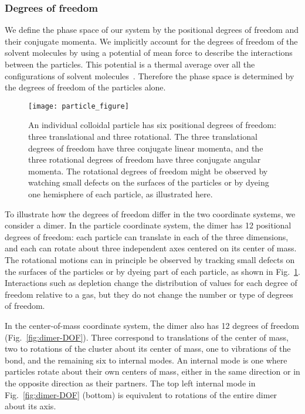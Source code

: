\documentclass[pre, aps, twocolumn, reprint, amsmath,amssymb, showpacs,
superscriptaddress] {revtex4-1}
\begin{document}
\subsubsection{Degrees of freedom}

We define the phase space of our system by the positional degrees of
freedom and their conjugate momenta. We implicitly account for the
degrees of freedom of the solvent molecules by using a potential of mean
force to describe the interactions between the particles. This potential
is a thermal average over all the configurations of solvent
molecules~\cite{poon_introduction_2006}. Therefore the phase space is
determined by the degrees of freedom of the particles alone.

\begin{figure}
	\begin{centering}
    \texttt{[image: particle\_figure]}
    \caption{An individual colloidal particle has six positional degrees
      of freedom: three translational and three rotational.  The three translational
      degrees of freedom have three conjugate linear momenta, and the three
      rotational degrees of freedom have three conjugate angular momenta.
      The rotational degrees of freedom might be observed by watching
      small defects on the surfaces of the particles or by dyeing one
      hemisphere of each particle, as illustrated here.
      \label{fig:ParticleDOF}}
	\end{centering}
\end{figure}

To illustrate how the degrees of freedom differ in the two coordinate
systems, we consider a dimer. In the particle coordinate system, the
dimer has 12 positional degrees of freedom: each particle can translate
in each of the three dimensions, and each can rotate about three
independent axes centered on its center of mass. The rotational motions
can in principle be observed by tracking small defects on the surfaces
of the particles or by dyeing part of each particle, as shown in
Fig.~\ref{fig:ParticleDOF}. Interactions such as depletion change the
distribution of values for each degree of freedom relative to a gas, but
they do not change the number or type of degrees of freedom.

In the center-of-mass coordinate system, the dimer also has 12 degrees
of freedom (Fig.~\ref{fig:dimer-DOF}). Three correspond to translations
of the center of mass, two to rotations of the cluster about its center
of mass, one to vibrations of the bond, and the remaining six to
internal modes. An internal mode is one where particles rotate about
their own centers of mass, either in the same direction or in the
opposite direction as their partners. The top left internal mode in
Fig.~\ref{fig:dimer-DOF} (bottom) is equivalent to rotations of the
entire dimer about its axis.
\end{document}
